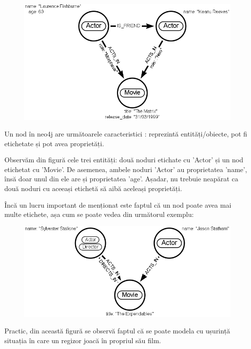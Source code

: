 \documentclass[12pt,a4paper]{report}
\begin{document}
\begin{figure}[H]
\centering
\caption{}
\includegraphics[scale=0.5]{exemplu_1_neo4j}
\caption*{}
\end{figure}


Un nod în neo4j are următoarele caracteristici \cite{6}: reprezintă entități/obiecte, pot fi etichetate și pot avea proprietăți.

Observăm din figură cele trei entități: două noduri etichate cu 'Actor' și un nod etichetat cu 'Movie'. De asemenea, ambele noduri 'Actor' au proprietatea 'name', însă doar unul din ele are și proprietatea 'age'. Așadar, nu trebuie neapărat ca două noduri cu aceeași etichetă să aibă aceleași proprietăți.

Încă un lucru important de menționat este faptul că un nod poate avea mai multe etichete, așa cum se poate vedea din următorul exemplu:


\begin{figure}[H]
\centering
\caption{}
\includegraphics[scale=0.5]{exemplu_2_neo4j}
\caption*{}
\end{figure}


Practic, din această figură se observă faptul că se poate modela cu ușurință situația în care un regizor joacă în propriul său film.
\end{document}

